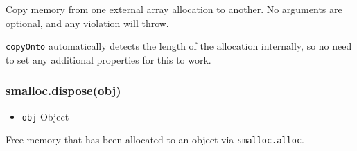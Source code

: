 Copy memory from one external array allocation to another. No arguments
are optional, and any violation will throw.

\begin{Shaded}
\begin{Highlighting}[]
 \NormalTok{(}\NormalTok{);}
 \NormalTok{(}\NormalTok{);}

 \NormalTok{(} 
  \NormalTok{;}
\NormalTok{\}}


\NormalTok{, }\NormalTok{);}

\end{Highlighting}
\end{Shaded}

\texttt{copyOnto} automatically detects the length of the allocation
internally, so no need to set any additional properties for this to
work.

\subsubsection{smalloc.dispose(obj)}\label{smalloc.disposeobj}

\begin{itemize}
\itemsep1pt\parskip0pt
\item
  \texttt{obj} Object
\end{itemize}

Free memory that has been allocated to an object via
\texttt{smalloc.alloc}.

\begin{Shaded}
\begin{Highlighting}[]
 
\NormalTok{(}



\CommentTok{// \{\}}
\end{Highlighting}
\end{Shaded}

